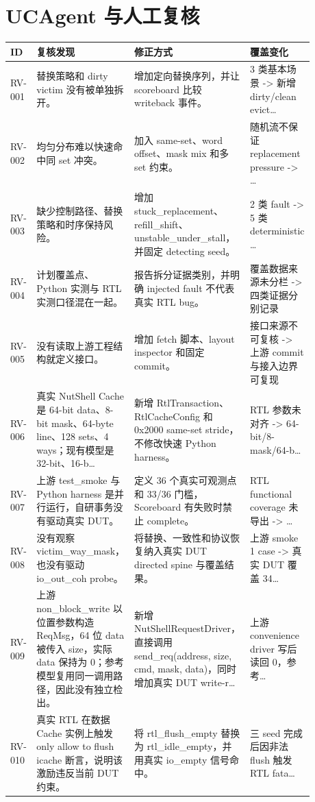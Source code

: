 \documentclass[UTF8,fontset=windows,zihao=-4]{ctexart}
\newcommand{\tightsection}[1]{\section{#1}\vspace{-0.2em}}
\begin{document}
\tightsection{UCAgent 与人工复核}
\begin{longtable}{P{0.09\linewidth}P{0.29\linewidth}P{0.33\linewidth}P{0.17\linewidth}}
\toprule
ID & 复核发现 & 修正方式 & 覆盖变化 \\
\midrule
\endhead
RV-001 & 替换策略和 dirty victim 没有被单独拆开。 & 增加定向替换序列，并让 scoreboard 比较 writeback 事件。 & 3 类基本场景 -> 新增 dirty/clean evict… \\
RV-002 & 均匀分布难以快速命中同 set 冲突。 & 加入 same-set、word offset、mask mix 和多 set 约束。 & 随机流不保证 replacement pressure -> … \\
RV-003 & 缺少控制路径、替换策略和时序保持风险。 & 增加 stuck\_replacement、refill\_shift、unstable\_under\_stall，并固定 detecting seed。 & 2 类 fault -> 5 类 deterministic … \\
RV-004 & 计划覆盖点、Python 实测与 RTL 实测口径混在一起。 & 报告拆分证据类别，并明确 injected fault 不代表真实 RTL bug。 & 覆盖数据来源未分栏 -> 四类证据分别记录 \\
RV-005 & 没有读取上游工程结构就定义接口。 & 增加 fetch 脚本、layout inspector 和固定 commit。 & 接口来源不可复核 -> 上游 commit 与接入边界可复现 \\
RV-006 & 真实 NutShell Cache 是 64-bit data、8-bit mask、64-byte line、128 sets、4 ways；现有模型是 32-bit、16-b… & 新增 RtlTransaction、RtlCacheConfig 和 0x2000 same-set stride，不修改快速 Python harness。 & RTL 参数未对齐 -> 64-bit/8-mask/64-b… \\
RV-007 & 上游 test\_smoke 与 Python harness 是并行运行，自研事务没有驱动真实 DUT。 & 定义 36 个真实可观测点和 33/36 门槛，Scoreboard 有失败时禁止 complete。 & RTL functional coverage 未导出 -> … \\
RV-008 & 没有观察 victim\_way\_mask，也没有驱动 io\_out\_coh probe。 & 将替换、一致性和协议恢复纳入真实 DUT directed spine 与覆盖结果。 & 上游 smoke 1 case -> 真实 DUT 覆盖 34… \\
RV-009 & 上游 non\_block\_write 以位置参数构造 ReqMsg，64 位 data 被传入 size，实际 data 保持为 0；参考模型复用同一调用路径，因此没有独立检出。 & 新增 NutShellRequestDriver，直接调用 send\_req(address, size, cmd, mask, data)，同时增加真实 DUT write-r… & 上游 convenience driver 写后读回 0，参考… \\
RV-010 & 真实 RTL 在数据 Cache 实例上触发 only allow to flush icache 断言，说明该激励违反当前 DUT 约束。 & 将 rtl\_flush\_empty 替换为 rtl\_idle\_empty，并用真实 io\_empty 信号命中。 & 三 seed 完成后因非法 flush 触发 RTL fata… \\
\bottomrule
\end{longtable}
\end{document}
